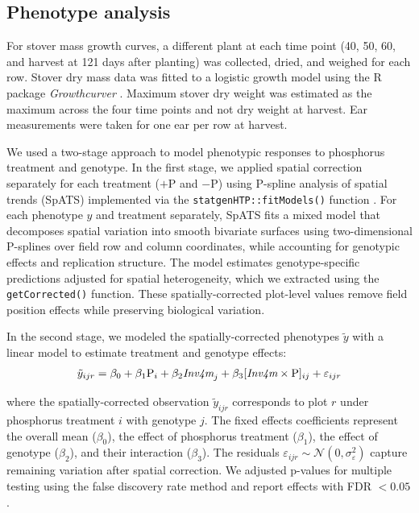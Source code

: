 \documentclass[9pt,twocolumn,twoside]{rilabRxiv}
\newcommand{\invfour}{\textit{Inv4m}\xspace}
\begin{document}
\subsection*{Phenotype analysis}

For stover mass growth curves, a different plant at each time point (40, 50, 60, and harvest at 121 days after planting) was collected, dried, and weighed for each row.
Stover dry mass data was fitted to a logistic growth model using the R package \textit{Growthcurver} \cite{sprouffske2016}.
Maximum stover dry weight was estimated as the maximum across the four time points and not dry weight at harvest.
Ear measurements were taken for one ear per row at harvest.

We used a two-stage approach to model phenotypic responses to phosphorus treatment and genotype.
In the first stage, we applied spatial correction separately for each treatment ($+$P and $-$P) using P-spline analysis of spatial trends (SpATS) \cite{rodriguez-alvarez2018} implemented via the \texttt{statgenHTP::fitModels()} function \cite{millet2025}.
For each phenotype $y$ and treatment separately, SpATS fits a mixed model that decomposes spatial variation into smooth bivariate surfaces using two-dimensional P-splines over field row and column coordinates, while accounting for genotypic effects and replication structure.
The model estimates genotype-specific predictions adjusted for spatial heterogeneity, which we extracted using the \texttt{getCorrected()} function.
These spatially-corrected plot-level values remove field position effects while preserving biological variation.

In the second stage, we modeled the spatially-corrected phenotypes $\tilde{y}$ with a linear model to estimate treatment and genotype effects:
\begin{eqnarray}
\label{eq:pheno_model}
\tilde{y}_{ijr} = \beta_0 + \beta_1 \text{P}_i + \beta_2 \textit{\invfour}_j + \beta_3 [\textit{\invfour} \times \text{P}]_{ij} + \varepsilon_{ijr}
\end{eqnarray}

where the spatially-corrected observation $\tilde{y}_{ijr}$ corresponds to plot $r$ under phosphorus treatment $i$ with genotype $j$.
The fixed effects coefficients represent the overall mean ($\beta_0$), the effect of phosphorus treatment ($\beta_1$), the effect of genotype ($\beta_2$), and their interaction ($\beta_3$).
The residuals $\varepsilon_{ijr} \sim \mathcal{N}(0, \sigma_\varepsilon^2)$ capture remaining variation after spatial correction.
We adjusted p-values for multiple testing using the false discovery rate method and report effects with FDR $< 0.05$.
\end{document}

